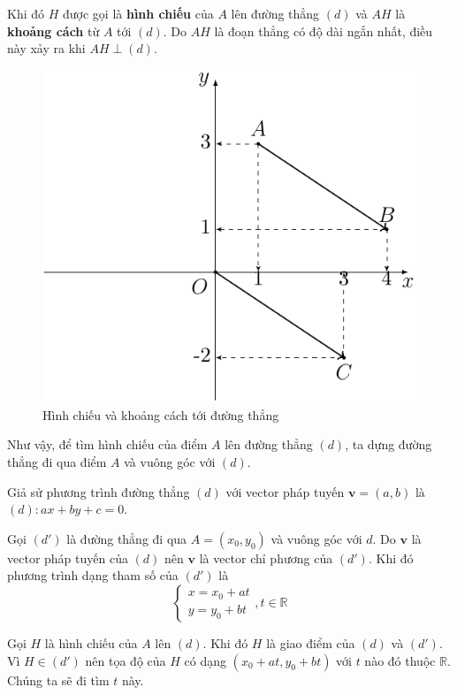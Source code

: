 Khi đó $H$ được gọi là \textbf{hình chiếu} của $A$ lên đường thẳng $(d)$ và $AH$ là \textbf{khoảng cách} từ $A$ tới $(d)$. Do $AH$ là đoạn thẳng có độ dài ngắn nhất, điều này xảy ra khi $AH \perp (d)$.

\begin{figure}[ht]
	\centering
	\includegraphics[page=2]{analytic_geometry/oxy1.pdf}
	\caption{Hình chiếu và khoảng cách tới đường thẳng}
	\label{oxy2}
\end{figure}

Như vậy, để tìm hình chiếu của điểm $A$ lên đường thẳng $(d)$, ta dựng đường thẳng đi qua điểm $A$ và vuông góc với $(d)$.

Giả sử phương trình đường thẳng $(d)$ với vector pháp tuyến $\bm{v} = (a, b)$ là $(d): ax + by + c = 0$.

Gọi $(d')$ là đường thẳng đi qua $A = (x_0, y_0)$ và vuông góc với $d$. Do $\bm{v}$ là vector pháp tuyến của $(d)$ nên $\bm{v}$ là vector chỉ phương của $(d')$. Khi đó phương trình dạng tham số của $(d')$ là \[\begin{cases}
	x = x_0 + a t \\ y = y_0 + b t
\end{cases}, t \in \mathbb{R}\]

Gọi $H$ là hình chiếu của $A$ lên $(d)$. Khi đó $H$ là giao điểm của $(d)$ và $(d')$. Vì $H \in (d')$ nên tọa độ của $H$ có dạng $(x_0 + at, y_0 + bt)$ với $t$ nào đó thuộc $\mathbb{R}$. Chúng ta sẽ đi tìm $t$ này.

